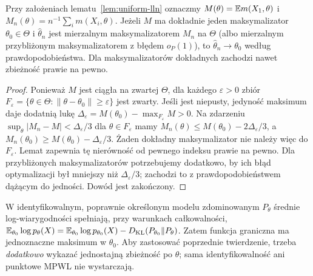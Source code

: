 \begin{twierdzenie}\label{thm:m-est-consistency}
Przy założeniach lematu~\ref{lem:uniform-lln} oznaczmy
$M(\theta)=\mathbb E m(X_1,\theta)$ i
$M_n(\theta)=n^{-1}\sum_i m(X_i,\theta)$.
Jeżeli $M$ ma dokładnie jeden maksymalizator $\theta_0\in\Theta$
i $\widehat\theta_n$ jest mierzalnym maksymalizatorem $M_n$
na $\Theta$ (albo mierzalnym przybliżonym maksymalizatorem
z błędem $o_P(1)$), to $\widehat\theta_n\to\theta_0$
według prawdopodobieństwa. Dla maksymalizatorów dokładnych
zachodzi nawet zbieżność prawie na pewno.
\end{twierdzenie}
\begin{proof}
Ponieważ $M$ jest ciągła na zwartej $\Theta$, dla każdego
$\varepsilon>0$ zbiór
$F_\varepsilon=\{\theta\in\Theta:\|\theta-\theta_0\|
\ge\varepsilon\}$ jest zwarty. Jeśli jest niepusty,
jedyność maksimum daje dodatnią lukę
$\Delta_\varepsilon=M(\theta_0)-\max_{F_\varepsilon}M>0$.
Na zdarzeniu $\sup_\theta|M_n-M|<\Delta_\varepsilon/3$
dla $\theta\in F_\varepsilon$ mamy
$M_n(\theta)\le M(\theta_0)-2\Delta_\varepsilon/3$,
a $M_n(\theta_0)\ge M(\theta_0)-\Delta_\varepsilon/3$.
Żaden dokładny maksymalizator nie należy więc do
$F_\varepsilon$. Lemat zapewnia tę nierówność od pewnego
indeksu prawie na pewno. Dla przybliżonych maksymalizatorów
potrzebujemy dodatkowo, by ich błąd optymalizacji był mniejszy niż
$\Delta_\varepsilon/3$; zachodzi to z prawdopodobieństwem dążącym
do jedności. Dowód jest zakończony.
\end{proof}

\begin{przyklad}
W identyfikowalnym, poprawnie określonym modelu zdominowanym
$P_\theta$ średnie log-wiarygodności spełniają, przy warunkach
całkowalności, $\mathbb E_{\theta_0}\log p_\theta(X)
=\mathbb E_{\theta_0}\log p_{\theta_0}(X)
-D_{\mathrm{KL}}(P_{\theta_0}\|P_\theta)$.
Zatem funkcja graniczna ma jednoznaczne maksimum w $\theta_0$.
Aby zastosować poprzednie twierdzenie, trzeba \emph{dodatkowo}
wykazać jednostajną zbieżność po $\theta$; sama identyfikowalność
ani punktowe MPWL nie wystarczają.
\end{przyklad}


